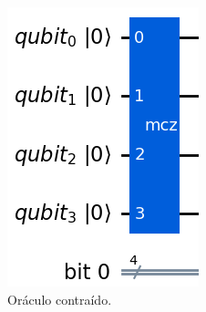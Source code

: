 \begin{figure}[!htb]
    \centering
    \captionsetup{justification=centering}
    \caption{Circuito Quântico Virtual - Oráculo}
    \label{fig:aplicacaoOraculo}

    \begin{subfigure}[b]{0.16\textwidth}
        \centering
        \includegraphics[width=\textwidth]{Imagens/oraculoContraido.png}
        \caption{Oráculo contraído.}
        \label{subfig:oraculoContraido}
    \end{subfigure}
    \hspace{1cm}
    \begin{subfigure}[b]{0.25\textwidth}
        \centering

\end{subfigure}
\end{figure}
